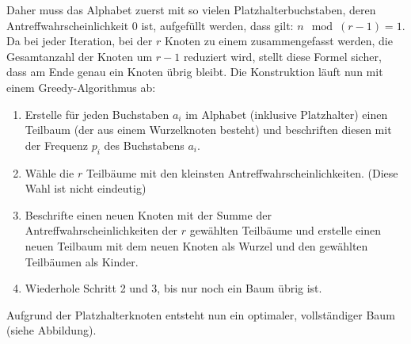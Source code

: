 \documentclass[a4paper,10pt,ngerman]{scrartcl}
\begin{document}
    Daher muss das Alphabet zuerst mit so vielen Platzhalterbuchstaben, deren Antreffwahrscheinlichkeit 0 ist, aufgefüllt werden, dass gilt: $n \mod (r - 1) = 1$.
    Da bei jeder Iteration, bei der $r$ Knoten zu einem zusammengefasst werden, die Gesamtanzahl der Knoten um $r-1$ reduziert wird, stellt diese Formel sicher, dass am Ende genau ein Knoten übrig bleibt.
    Die Konstruktion läuft nun mit einem Greedy-Algorithmus ab:
    \begin{enumerate}
        \item Erstelle für jeden Buchstaben $a_i$ im Alphabet (inklusive Platzhalter) einen Teilbaum (der aus einem Wurzelknoten besteht) und beschriften diesen mit der Frequenz $p_i$ des Buchstabens $a_i$.
        \item Wähle die $r$ Teilbäume mit den kleinsten Antreffwahrscheinlichkeiten. (Diese Wahl ist nicht eindeutig)
        \item Beschrifte einen neuen Knoten mit der Summe der Antreffwahrscheinlichkeiten der $r$ gewählten Teilbäume und erstelle einen neuen Teilbaum mit dem neuen Knoten als Wurzel und den gewählten Teilbäumen als Kinder.
        \item Wiederhole Schritt 2 und 3, bis nur noch ein Baum übrig ist.
    \end{enumerate}
    Aufgrund der Platzhalterknoten entsteht nun ein optimaler, vollständiger Baum (siehe Abbildung).
\end{document}
